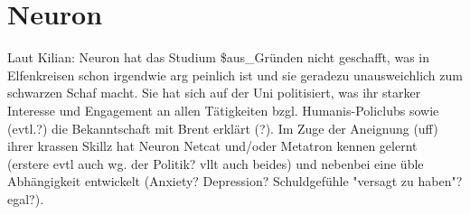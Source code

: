 \section{Neuron}
Laut Kilian: Neuron hat das Studium \$aus\_Gründen nicht geschafft, was in Elfenkreisen schon irgendwie arg peinlich ist und sie geradezu unausweichlich zum schwarzen Schaf macht. Sie hat sich auf der Uni politisiert, was ihr starker Interesse und Engagement an allen Tätigkeiten bzgl. Humanis-Policlubs sowie (evtl.?) die Bekanntschaft mit Brent erklärt (?). Im Zuge der Aneignung (uff) ihrer krassen Skillz hat Neuron Netcat und/oder Metatron kennen gelernt (erstere evtl auch wg. der Politik? vllt auch beides) und nebenbei eine üble Abhängigkeit entwickelt (Anxiety? Depression? Schuldgefühle "versagt zu haben"? egal?).



